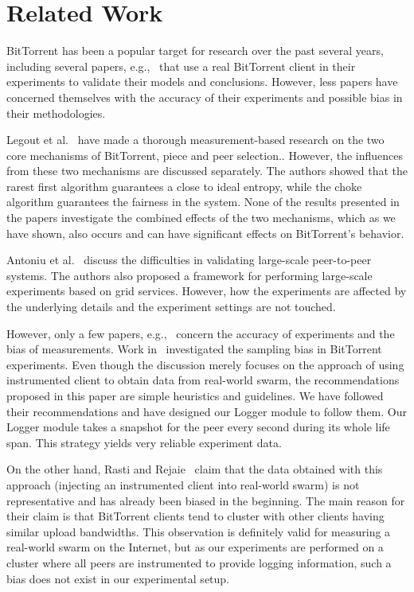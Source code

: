 \documentclass[10pt,letterpaper,twocolumn]{article}
\begin{document}
\section{Related Work}
\label{related_work}

BitTorrent has been a popular target for research over the past
several years, including several papers, e.g.,~\cite{meu09, ross06,
  sirvian07, legout07, legout05} that use a real BitTorrent client in
their experiments to validate their models and conclusions. However,
less papers have concerned themselves with the accuracy of their
experiments and possible bias in their methodologies.

Legout et al.~\cite{legout05, legout06} have made a thorough
measurement-based research on the two core mechanisms of BitTorrent,
piece and peer selection.. However, the influences from these two
mechanisms are discussed separately. The authors showed that the
rarest first algorithm guarantees a close to ideal entropy, while the
choke algorithm guarantees the fairness in the system. None of the
results presented in the papers investigate the combined effects of
the two mechanisms, which as we have shown, also occurs and can have
significant effects on BitTorrent's behavior.

Antoniu et al.~\cite{antoniu04} discuss the difficulties in validating
large-scale peer-to-peer systems. The authors also proposed a
framework for performing large-scale experiments based on grid
services. However, how the experiments are affected by the underlying
details and the experiment settings are not touched.

However, only a few papers, e.g.,~\cite{ras07,boxun10,rao10} concern
the accuracy of experiments and the bias of measurements. Work
in~\cite{boxun10} investigated the sampling bias in BitTorrent
experiments. Even though the discussion merely focuses on the approach
of using instrumented client to obtain data from real-world swarm, the
recommendations proposed in this paper are simple heuristics and
guidelines. We have followed their recommendations and have designed
our Logger module to follow them. Our Logger module takes a snapshot
for the peer every second during its whole life span. This strategy
yields very reliable experiment data.

On the other hand, Rasti and Rejaie~\cite{ras07} claim that the data
obtained with this approach (injecting an instrumented client into
real-world swarm) is not representative and has already been biased in
the beginning. The main reason for their claim is that BitTorrent
clients tend to cluster with other clients having similar upload
bandwidths. This observation is definitely valid for measuring a
real-world swarm on the Internet, but as our experiments are performed
on a cluster where all peers are instrumented to provide logging
information, such a bias does not exist in our experimental setup.
\end{document}
